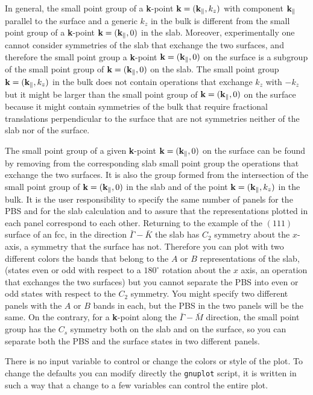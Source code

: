 \documentclass[12pt,a4paper]{article}
\begin{document}
In general, the small point group of a {\bf k}-point 
${\bf k}=({\bf k}_\parallel, 
k_z)$ with component ${\bf k}_\parallel$ parallel to the surface 
and a generic $k_z$ in the bulk is different 
from the small point group of a {\bf k}-point ${\bf k}=({\bf k}_\parallel, 0)$ 
in the slab. Moreover, experimentally one cannot consider symmetries
of the slab that exchange the two surfaces, and therefore the small
point group a {\bf k}-point ${\bf k}=({\bf k}_\parallel, 0)$ on the surface
is a subgroup of the small point group of ${\bf k}=({\bf k}_\parallel, 0)$
on the slab. The small point group ${\bf k}=({\bf k}_\parallel, k_z)$ 
in the bulk does not contain operations that exchange $k_z$ 
with $-k_z$
but it might be larger than the small point group of 
${\bf k}=({\bf k}_\parallel, 0)$ on the surface because
it might contain symmetries of the bulk that require fractional translations
perpendicular to the surface that are not symmetries neither of the slab nor of
the surface.

The small point group of a given {\bf k}-point ${\bf k}=({\bf k}_\parallel, 0)$
on the surface can be found by removing from the corresponding slab small
point group the
operations that exchange the two surfaces. It is also the group formed
from the intersection of the small point group of 
${\bf k}=({\bf k}_\parallel, 0)$ in the slab and of the point 
${\bf k}=({\bf k}_\parallel, k_z)$ in the bulk.
It is the user responsibility to specify the same number of panels
for the PBS and for the slab calculation and to assure that the
representations plotted in each panel correspond to each other.
Returning to the example of the $(111)$ surface of an fcc, in the direction
$\bar \Gamma-\bar K$ the slab has $C_2$ symmetry about the $x$-axis, a symmetry
that the surface has not. Therefore you can plot with two different colors
the bands that belong to the $A$ or $B$ representations of the slab,
(states even or odd with respect to a $180^\circ$ rotation about
the $x$ axis, an operation that exchanges the two surfaces)
but you cannot separate the PBS into even or odd states with respect to 
the $C_2$ symmetry. You might specify two different panels with the
$A$ or $B$ bands in each, but the PBS in the two panels will be the same. 
On the contrary, for a {\bf k}-point along the $\bar \Gamma-\bar M$ direction, 
the small point group has the $C_s$ symmetry both on the slab and on
the surface, so you can separate both the PBS 
and the surface states in two different panels.

There is no input variable to control or change the colors or style of the 
plot. To change the defaults you can modify directly the \texttt{gnuplot} 
script, it is written in such a way that a change to a few variables can
control the entire plot.
\end{document}

